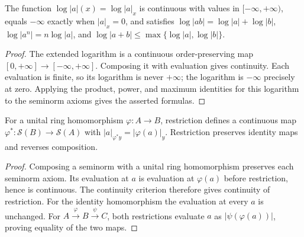 \begin{lemma}\label{spectrum:logarithmic-evaluation}
\leanok
{}
The function $\log|a|(x)=\log|a|_x$ is continuous with values in
$[-\infty,+\infty)$, equals $-\infty$ exactly when $|a|_x=0$, and satisfies
$\log|ab|=\log|a|+\log|b|$, $\log|a^n|=n\log|a|$, and
$\log|a+b|\le\max\{\log|a|,\log|b|\}$.
\end{lemma}
\begin{proof}
The extended logarithm is a continuous order-preserving map
$[0,+\infty]\to[-\infty,+\infty]$. Composing it with evaluation gives continuity.
Each evaluation is finite, so its logarithm is never $+\infty$; the logarithm is
$-\infty$ precisely at zero. Applying the product, power, and maximum identities
for this logarithm to the seminorm axioms gives the asserted formulas.
\end{proof}

\begin{lemma}\label{spectrum:pullback}
\leanok
{}
For a unital ring homomorphism $\varphi\colon A\to B$, restriction defines
a continuous map $\varphi^*\colon\mathcal S(B)\to\mathcal S(A)$ with
$|a|_{\varphi^*y}=|\varphi(a)|_y$. Restriction preserves identity maps and
reverses composition.
\end{lemma}
\begin{proof}
Composing a seminorm with a unital ring homomorphism preserves each seminorm axiom.
Its evaluation at $a$ is evaluation at $\varphi(a)$ before restriction, hence is continuous.
The continuity criterion therefore gives continuity of restriction.
For the identity homomorphism the evaluation at every $a$ is unchanged.
For $A\xrightarrow{\varphi}B\xrightarrow{\psi}C$, both restrictions evaluate
$a$ as $|\psi(\varphi(a))|$, proving equality of the two maps.
\end{proof}

